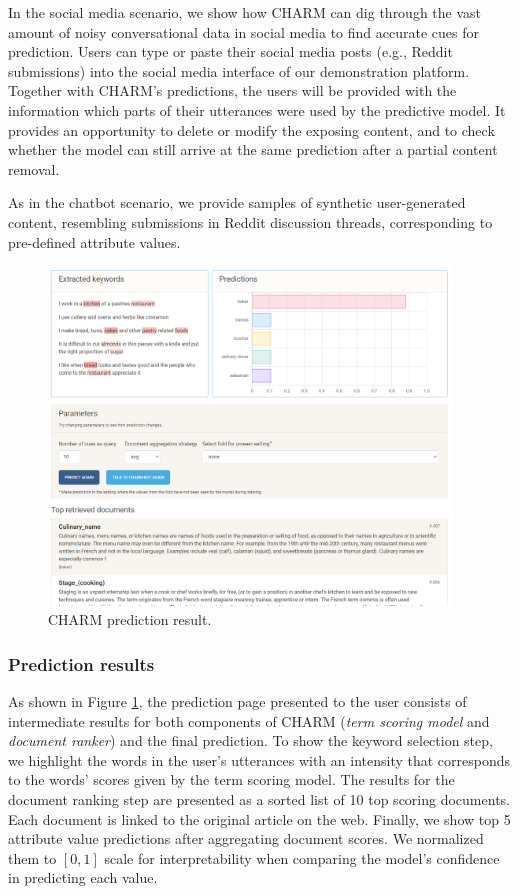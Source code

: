 In the social media scenario, we show how CHARM 
can dig through the vast amount of 
noisy 
conversational data in social media to find accurate cues for prediction.
Users can type or paste their social media posts (e.g., Reddit submissions) into the social media interface of our demonstration platform. Together with CHARM's predictions, the users will be provided with the information which parts of their utterances were used by the predictive model. It provides an opportunity to delete or modify the exposing content, and to check whether the model can still arrive at the same prediction after a partial content removal.

As in the chatbot scenario, we provide samples of synthetic user-generated content, resembling submissions in Reddit discussion threads, corresponding to pre-defined attribute values.


\begin{figure}[th!]
    \centering
    \includegraphics[width=0.95\textwidth]{imgs/prediction-baker.png}
    \caption{CHARM prediction result.}
    \label{pred_img}
\end{figure}

\subsubsection{Prediction results} 
As shown in Figure \ref{pred_img}, the prediction page presented to the user consists of intermediate results for both components of CHARM (\textit{term scoring model} and \textit{document ranker}) and the final prediction. To show the keyword selection step, we highlight the words in the user's utterances with an intensity that corresponds to the words' scores given by the {term scoring model}. The results for the document ranking step are presented as a sorted list of 10 top scoring documents. Each document is linked to the original article on the web. Finally, we show top 5 attribute value predictions after aggregating document scores. We normalized them to $[0,1]$ scale for interpretability when comparing the model's confidence in predicting each value. 

